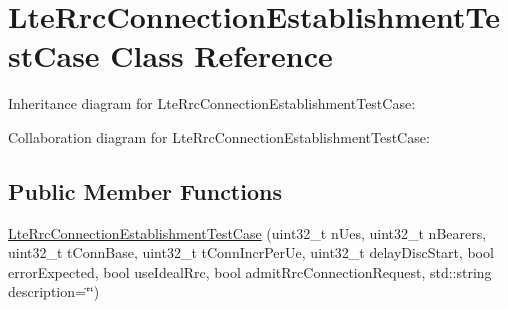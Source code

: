\hypertarget{classLteRrcConnectionEstablishmentTestCase}{}\section{Lte\+Rrc\+Connection\+Establishment\+Test\+Case Class Reference}
\label{classLteRrcConnectionEstablishmentTestCase}


Inheritance diagram for Lte\+Rrc\+Connection\+Establishment\+Test\+Case\+:


Collaboration diagram for Lte\+Rrc\+Connection\+Establishment\+Test\+Case\+:
\subsection*{Public Member Functions}
\begin{DoxyCompactItemize}
\item 
\hyperlink{classLteRrcConnectionEstablishmentTestCase_a18842356242310e2abf167b96fd5d10c}{Lte\+Rrc\+Connection\+Establishment\+Test\+Case} (uint32\+\_\+t n\+Ues, uint32\+\_\+t n\+Bearers, uint32\+\_\+t t\+Conn\+Base, uint32\+\_\+t t\+Conn\+Incr\+Per\+Ue, uint32\+\_\+t delay\+Disc\+Start, bool error\+Expected, bool use\+Ideal\+Rrc, bool admit\+Rrc\+Connection\+Request, std\+::string description=\char`\"{}\char`\"{})
\end{DoxyCompactItemize}
